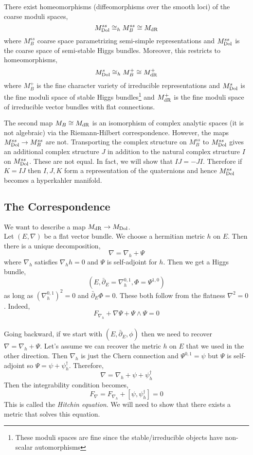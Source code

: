 \documentclass[12pt]{article}
\begin{document}
\begin{theorem}
There exist homeomorphisms (diffeomorphisms over the smooth loci) of the coarse moduli spaces,
\[ M_{\mathrm{Dol}}^{ss} \cong_h M_B^{ss} \cong M_{\mathrm{dR}} \]
where $M_B^{ss}$ coarse space parametrizing semi-simple representations and $M_{\mathrm{Dol}}^{ss}$ is the coarse space of semi-stable Higgs bundles. Moreover, this restricts to homeomorphisms,
\[ M_{\mathrm{Dol}}^{s} \cong_h M_B^{+} \cong M_{\mathrm{dR}}^{+} \]
where $M_B^{+}$ is the fine character variety of irreducible representations and $M_{\mathrm{Dol}}^{s}$ is the fine moduli space of stable Higgs bundles\footnote{These moduli spaces are fine since the stable/irreducible objects have non-scalar automorphisms} and $M_{\mathrm{dR}}^{+}$ is the fine moduli space of irreducible vector bundles with flat connections.
\end{theorem}

\begin{rmk}
The second map $M_B \cong M_{\mathrm{dR}}$ is an isomorphism of complex analytic spaces (it is not algebraic) via the Riemann-Hilbert correspondence. However, the maps $M_{\mathrm{Dol}}^{ss} \to M_B^{ss}$ are not. Transporting the complex structure on $M_B^{ss}$ to $M_{\mathrm{Dol}}^{ss}$ gives an additional complex structure $J$ in addition to the natural complex structure $I$ on $M_{\mathrm{Dol}}^{ss}$. These are not equal. In fact, we will show that $IJ = -JI$. Therefore if $K = IJ$ then $I,J,K$ form a representation of the quaternions and hence $M_{\mathrm{Dol}}^{ss}$ becomes a hyperkahler manifold.
\end{rmk}

\subsection{The Correspondence}


\newcommand{\dbar}{\bar{\partial}}
\newcommand{\hol}{\mathrm{hol}}

We want to describe a map $M_{\mathrm{dR}} \to M_{\mathrm{Dol}}$. 
\bigskip\\
Let $(E, \nabla)$ be a flat vector bundle. We choose a hermitian metric $h$ on $E$. Then there is a unique decomposition,
\[ \nabla = \nabla_h + \Psi \]
where $\nabla_h$ satisfies $\nabla_h h = 0$ and $\Psi$ is self-adjoint for $h$. Then we get a Higgs bundle,
\[ (E, \dbar_E = \nabla_h^{0,1}, \Phi = \Psi^{1,0}) \]
as long as $(\nabla_h^{0,1})^2 = 0$  and $\dbar_E \Phi = 0$. These both follow from the flatness $\nabla^2 = 0$. Indeed,
\[ F_{\nabla_h} + \nabla \Psi + \Psi \wedge \Psi = 0 \] 
\bigskip\\
Going backward, if we start with $(E, \dbar_E, \phi)$ then we need to recover $\nabla = \nabla_h + \Psi$. Let's assume we can recover the metric $h$ on $E$ that we used in the other direction. Then $\nabla_h$ is just the Chern connection and $\Psi^{0,1} = \psi$ but $\Psi$ is self-adjoint so $\Psi = \psi + \psi^{\dagger}_h$. Therefore,
\[ \nabla = \nabla_h + \psi + \psi^{\dagger}_h \]
Then the integrability condition becomes,
\[ F_{\nabla} = F_{\nabla_h} + [\psi, \psi^{\dagger}_h] = 0 \]
This is called the \textit{Hitchin equation}. We will need to show that there exists a metric that solves this equation. 
\end{document}

